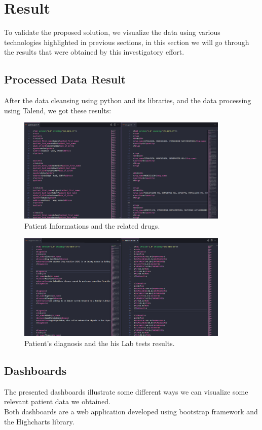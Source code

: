 \section{Result}
To validate the proposed solution, we visualize the data  using various technologies highlighted in previous sections, in this section we will go through the results that were obtained by this investigatory effort.
\subsection{Processed Data Result}
After the data cleansing using python and its libraries, and the data processing using Talend, we got these results:


\begin{figure}[h!]
    \center
    \includegraphics[width=0.90\textwidth]{images/chapter4/result1.PNG}
    \caption{Patient Informations and the related drugs.}
    \label{fig:resultone}
\end{figure}
\begin{figure}[h!]
    \center
    \includegraphics[width=0.90\textwidth]{images/chapter4/result2.PNG}
    \caption{Patient's diagnosis and the his Lab tests results.}
    \label{fig:resulttwo}
\end{figure}

\subsection{Dashboards}
The presented dashboards illustrate some different ways we can visualize some relevant patient data we obtained.\\
Both dashboards are a web application developed using bootstrap\cite{IntroductionBootstrapV5}  framework and the Highcharts  library.

